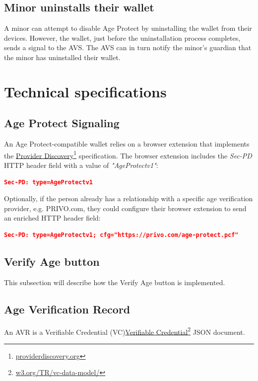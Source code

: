 \documentclass[11pt, oneside]{article}   	%
\newcommand{\hyperfootnote}[1][]{\def\ArgI{{#1}}\hyperfootnoteRelay}
\newcommand\hyperfootnoteRelay[2][]{\href{#1#2}{\ArgI}\footnote{\href{#1#2}{#2}}}
\begin{document}
\subsection{Minor uninstalls their wallet}

A minor can attempt to disable Age Protect by uninstalling the wallet from their devices. However, the wallet, just before the uninstallation process completes, sends a signal to the AVS. The AVS can in turn notify the minor's guardian that the minor has uninstalled their wallet.

\section{Technical specifications}

\subsection{Age Protect Signaling}
 
An Age Protect-compatible wallet relies on a browser extension that implements the \hyperfootnote[Provider Discovery][https://]{providerdiscovery.org} specification. The browser extension includes the \emph{Sec-PD} HTTP header field with a value of \emph{"AgeProtectv1"}:
\begin{lstlisting}[language=json,firstnumber=1]
	Sec-PD: type=AgeProtectv1
\end{lstlisting}

Optionally, if the person already has a relationship with a specific age verification provider, e.g. PRIVO.com, they could configure their browser extension to send an enriched HTTP header field:
\begin{lstlisting}[language=json,firstnumber=1]
	Sec-PD: type=AgeProtectv1; cfg="https://privo.com/age-protect.pcf"
\end{lstlisting}
\subsection{Verify Age button}

This subsection will describe how the Verify Age button is implemented. 

\subsection{Age Verification Record}

An AVR is a Verifiable Credential (VC)\hyperfootnote[Verifiable Credential][https://]{w3.org/TR/vc-data-model/} JSON document. 
\end{document}
